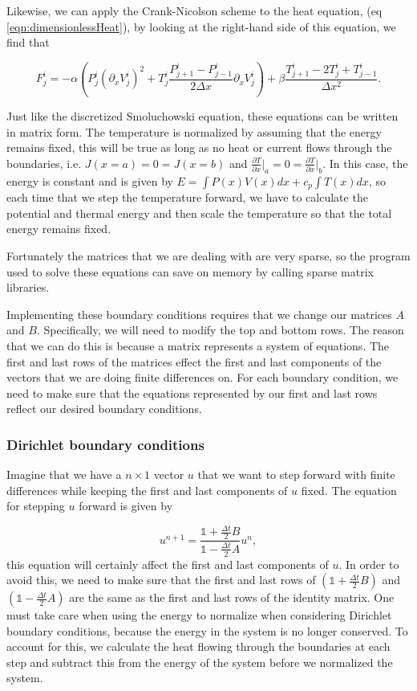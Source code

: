 Likewise, we can apply the Crank-Nicolson scheme to the heat equation, (eq \ref{eqn:dimensionlessHeat}), by looking at the right-hand side of this equation, we find that

\begin{equation}
F_j^i = -\alpha \left (P_j^i (\partial_x V_j^i)^2 + T_j^i \frac{P_{j+1}^i - P_{j-1}^i }{2 \Delta x}\partial_x V_j^i  \right) + \beta \frac{T_{j+1}^i - 2T_j^i + T_{j-1}^i}{\Delta x^2}.
\end{equation}

Just like the discretized Smoluchowski equation, these equations can be written in matrix form. The temperature is normalized by assuming that the energy remains fixed, this will be true as long as no heat or current flows through the boundaries, i.e. $J(x=a) = 0 = J(x = b)$ and $\frac{\partial T}{\partial x} \rvert_a = 0 = \frac{\partial T}{\partial x} \rvert_b$. In this case, the energy is constant and is given by $E = \int P(x) V(x) dx + c_p \int T(x) dx$, so each time that we step the temperature forward, we have to calculate the potential and thermal energy and then scale the temperature so that the total energy remains fixed.

Fortunately the matrices that we are dealing with are very sparse, so the program used to solve these equations can save on memory by calling sparse matrix libraries.

Implementing these boundary conditions requires that we change our matrices $A$ and $B$. Specifically, we will need to modify the top and bottom rows. The reason that we can do this is because a matrix represents a system of equations. The first and last rows of the matrices effect the first and last components of the vectors that we are doing finite differences on. For each boundary condition, we need to make sure that the equations represented by our first and last rows reflect our desired boundary conditions.

\subsubsection{Dirichlet boundary conditions}
Imagine that we have a $n \times 1$ vector $u$ that we want to step forward with finite differences while keeping the first and last components of $u$ fixed. The equation for stepping $u$ forward is given by

\begin{equation}
u^{n+1} = \frac{\mathbb{1} + \frac{\Delta t}{2} B}{\mathbb{1} - \frac{\Delta t}{2} A} u^n,
\end{equation}
this equation will certainly affect the first and last components of $u$. In order to avoid this, we need to make sure that the first and last rows of $(\mathbb{1} + \frac{\Delta t}{2} B)$ and $(\mathbb{1} - \frac{\Delta t}{2} A)$ are the same as the first and last rows of the identity matrix.  One must take care when using the energy to normalize when considering Dirichlet boundary conditions, because the energy in the system is no longer conserved. To account for this, we calculate the heat flowing through the boundaries at each step and subtract this from the energy of the system before we normalized the system.

